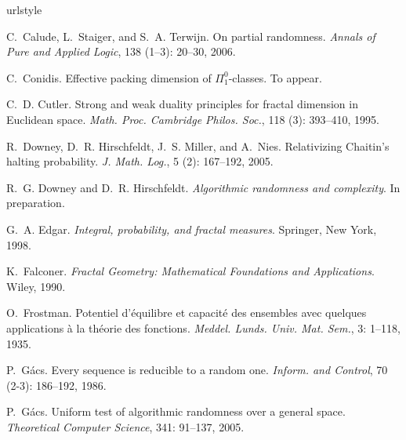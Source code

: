 \documentclass[11pt,reqno]{article}
\theoremstyle{plain}
\theoremstyle{definition}
\theoremstyle{remark}
\numberwithin{equation}{section}
\begin{document}
\begin{thebibliography}{41}
\providecommand{\natexlab}[1]{#1}
\providecommand{\url}[1]{\texttt{#1}}
\expandafter\ifx\csname urlstyle\endcsname\relax
  \providecommand{\doi}[1]{doi: #1}\else
  \providecommand{\doi}{doi: \begingroup \urlstyle{rm}\Url}\fi

C.~Calude, L.~Staiger, and S.~A. Terwijn.
\newblock On partial randomness.
\newblock \emph{Annals of {P}ure and {A}pplied {L}ogic}, 138
  (1--3): 20--30, 2006.

C.~Conidis.
\newblock Effective packing dimension of $\Pi^0_1$-classes.
\newblock To appear.

C.~D. Cutler.
\newblock Strong and weak duality principles for fractal dimension in
  {E}uclidean space.
\newblock \emph{Math. Proc. Cambridge Philos. Soc.}, 118 (3):
  393--410, 1995.

R.~Downey, D.~R. Hirschfeldt, J.~S. Miller, and A.~Nies.
\newblock Relativizing {C}haitin's halting probability.
\newblock \emph{J. Math. Log.}, 5 (2): 167--192, 2005.

R.~G. Downey and D.~R. Hirschfeldt.
\newblock \emph{Algorithmic randomness and complexity}.
\newblock In preparation.

G.~A. Edgar.
\newblock \emph{Integral, probability, and fractal measures}.
\newblock Springer, New York, 1998.

K.~Falconer.
\newblock \emph{Fractal Geometry: Mathematical Foundations and Applications}.
\newblock Wiley, 1990.

O.~Frostman.
\newblock Potentiel d'\'equilibre et capacit\'e des ensembles avec quelques
  applications \`a la th\'eorie des fonctions.
\newblock \emph{Meddel. Lunds. Univ. Mat. Sem.}, 3: 1--118, 1935.

P.~G{\'a}cs.
\newblock Every sequence is reducible to a random one.
\newblock \emph{Inform. and Control}, 70 (2-3): 186--192,
  1986.

P.~G{\'a}cs.
\newblock Uniform test of algorithmic randomness over a general space.
\newblock \emph{Theoretical Computer Science}, 341: 91--137, 2005.


\end{thebibliography}
\end{document}

